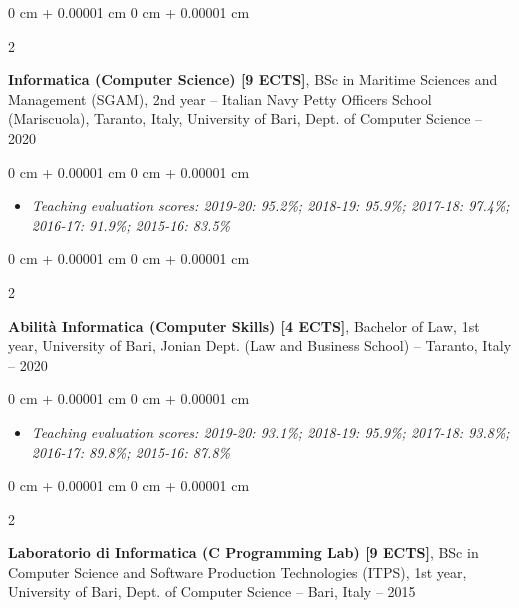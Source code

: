 \documentclass[10pt, a4paper]{article}
\newenvironment{highlights}{
    \begin{itemize}[
        topsep=0.10 cm,
        parsep=0.10 cm,
        partopsep=0pt,
        itemsep=0pt,
        leftmargin=0 cm + 10pt
    ]
}{
    \end{itemize}
} %
\newenvironment{onecolentry}{
    \begin{adjustwidth}{
        0 cm + 0.00001 cm
    }{
        0 cm + 0.00001 cm
    }
}{
    \end{adjustwidth}
} %
\newenvironment{twocolentry}[2][]{
    \onecolentry
    \def\secondColumn{#2}
    \setcolumnwidth{\fill, 4.5 cm}
    \begin{paracol}{2}
}{
    \switchcolumn \raggedleft \secondColumn
    \end{paracol}
    \endonecolentry
} %
\begin{document}
        \vspace{0.2 cm}

        \begin{twocolentry}{
            2015 – 2020
        }
            \textbf{Informatica (Computer Science) [9 ECTS]}, BSc in Maritime Sciences and Management (SGAM), 2nd year -- Italian Navy Petty Officers School (Mariscuola), Taranto, Italy, University of Bari, Dept. of Computer Science\end{twocolentry}

        \vspace{0.10 cm}
        \begin{onecolentry}
            \begin{highlights}
                \item \textit{Teaching evaluation scores: 2019-20: 95.2\%; 2018-19: 95.9\%; 2017-18: 97.4\%; 2016-17: 91.9\%; 2015-16: 83.5\%}
            \end{highlights}
        \end{onecolentry}


        \vspace{0.2 cm}

        \begin{twocolentry}{
            2015 – 2020
        }
            \textbf{Abilità Informatica (Computer Skills) [4 ECTS]}, Bachelor of Law, 1st year, University of Bari, Jonian Dept. (Law and Business School) -- Taranto, Italy\end{twocolentry}

        \vspace{0.10 cm}
        \begin{onecolentry}
            \begin{highlights}
                \item \textit{Teaching evaluation scores: 2019-20: 93.1\%; 2018-19: 95.9\%; 2017-18: 93.8\%; 2016-17: 89.8\%; 2015-16: 87.8\%}
            \end{highlights}
        \end{onecolentry}


        \vspace{0.2 cm}

        \begin{twocolentry}{
            2013 – 2015
        }
            \textbf{Laboratorio di Informatica (C Programming Lab) [9 ECTS]}, BSc in Computer Science and Software Production Technologies (ITPS), 1st year, University of Bari, Dept. of Computer Science -- Bari, Italy\end{twocolentry}
\end{document}
